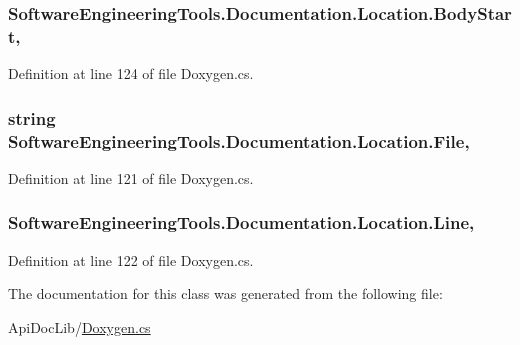 \hypertarget{class_software_engineering_tools_1_1_documentation_1_1_location_aa4f3164d2444ad20dbc297e3aebaf4d8}{
\subsubsection[{Body\+Start}]{ Software\+Engineering\+Tools.\+Documentation.\+Location.\+Body\+Start\hspace{0.3cm}{\ttfamily [get]}, {\ttfamily [set]}}}\label{class_software_engineering_tools_1_1_documentation_1_1_location_aa4f3164d2444ad20dbc297e3aebaf4d8}


Definition at line 124 of file Doxygen.\+cs.

\hypertarget{class_software_engineering_tools_1_1_documentation_1_1_location_a98e8fc3bd0ae61be01ab5071b92f6e3c}{
\subsubsection[{File}]{\setlength{\rightskip}{0pt plus 5cm}string Software\+Engineering\+Tools.\+Documentation.\+Location.\+File\hspace{0.3cm}{\ttfamily [get]}, {\ttfamily [set]}}}\label{class_software_engineering_tools_1_1_documentation_1_1_location_a98e8fc3bd0ae61be01ab5071b92f6e3c}


Definition at line 121 of file Doxygen.\+cs.

\hypertarget{class_software_engineering_tools_1_1_documentation_1_1_location_af7d5f6bd7cf1a468b61bd6e80e73ac01}{
\subsubsection[{Line}]{ Software\+Engineering\+Tools.\+Documentation.\+Location.\+Line\hspace{0.3cm}{\ttfamily [get]}, {\ttfamily [set]}}}\label{class_software_engineering_tools_1_1_documentation_1_1_location_af7d5f6bd7cf1a468b61bd6e80e73ac01}


Definition at line 122 of file Doxygen.\+cs.



The documentation for this class was generated from the following file\+:\begin{DoxyCompactItemize}
\item 
Api\+Doc\+Lib/\hyperlink{_doxygen_8cs}{Doxygen.\+cs}\end{DoxyCompactItemize}
